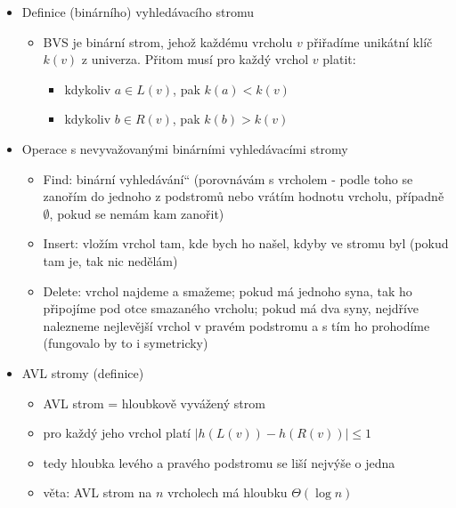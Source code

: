 \begin{itemize}
\begin{itemize}
\begin{itemize}
\begin{itemize}
\item $i$-tá vrstva $\quad \frac {n}{2^i}\quad 3^i$
\item poslední vrstva $\quad 1\quad 3^{\log_2 n}$
\end{itemize}
\item $T(n)=\sum_{i=0}^{\log_2 n}n\cdot(3/2)^i\in\Theta(n\cdot (3/2)^{\log_2n})$, což lze převést na $\Theta(n^{\log_23})$
\item podle Master theorem $a=3,\,b=2,\,c=1$
\end{itemize}
\end{itemize}
\item Definice (binárního) vyhledávacího stromu
\begin{itemize}
\item BVS je binární strom, jehož každému vrcholu $v$ přiřadíme unikátní klíč $k(v)$ z univerza. Přitom musí pro každý vrchol $v$ platit:
\begin{itemize}
\item kdykoliv $a\in L(v)$, pak $k(a)\lt k(v)$
\item kdykoliv $b\in R(v)$, pak $k(b)\gt k(v)$
\end{itemize}
\end{itemize}
\item Operace s nevyvažovanými binárními vyhledávacími stromy
\begin{itemize}
\item Find: \quotedblbase{}binární vyhledávání\textquotedblleft{} (porovnávám s vrcholem - podle toho se zanořím do jednoho z podstromů nebo vrátím hodnotu vrcholu, případně $\emptyset$, pokud se nemám kam zanořit)
\item Insert: vložím vrchol tam, kde bych ho našel, kdyby ve stromu byl (pokud tam je, tak nic nedělám)
\item Delete: vrchol najdeme a smažeme; pokud má jednoho syna, tak ho připojíme pod otce smazaného vrcholu; pokud má dva syny, nejdříve nalezneme nejlevější vrchol v pravém podstromu a s tím ho prohodíme (fungovalo by to i symetricky)
\end{itemize}
\item AVL stromy (definice)
\begin{itemize}
\item AVL strom = hloubkově vyvážený strom
\item pro každý jeho vrchol platí $|h(L(v))-h(R(v))|\leq1$
\item tedy hloubka levého a pravého podstromu se liší nejvýše o jedna
\item věta: AVL strom na $n$ vrcholech má hloubku $\Theta(\log n)$

\end{itemize}
\end{itemize}

